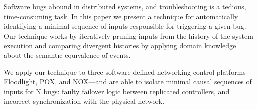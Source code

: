 Software bugs abound in distributed systems, and troubleshooting
is a tedious, time-consuming task.
In this paper we present a technique for automatically identifying
a minimal sequence of inputs responsible for triggering a given bug.
Our technique works by
iteratively pruning inputs from the history of the system execution and
comparing divergent histories
by applying domain knowledge about the semantic equivalence of events.

We apply our technique to three software-defined networking control
platforms---Floodlight, POX, and NOX---and
are able to isolate minimal causal sequences of inputs for
\num{N} bugs: faulty failover logic between replicated controllers, and incorrect
synchronization with the physical network.
